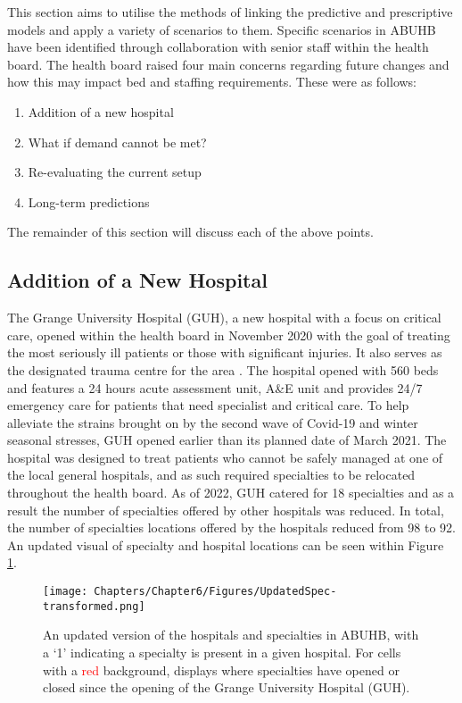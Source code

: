 \documentclass[../thesis.tex]{subfiles}
\begin{document}
This section aims to utilise the methods of linking the predictive and prescriptive models and apply a variety of scenarios to them. Specific scenarios in ABUHB have been identified through collaboration with senior staff within the health board. The health board raised four main concerns regarding future changes and how this may impact bed and staffing requirements. These were as follows:

\begin{enumerate}
    \item Addition of a new hospital
    \item What if demand cannot be met? 
    \item Re-evaluating the current setup
    \item Long-term predictions
\end{enumerate}

The remainder of this section will discuss each of the above points.

\subsection{Addition of a New Hospital}\label{sec:scenario1}
The Grange University Hospital (GUH), a new hospital with a focus on critical care, opened within the health board in November 2020 with the goal of treating the most seriously ill patients or those with significant injuries. It also serves as the designated trauma centre for the area \cite{NHSWalesa}. The hospital opened with 560 beds and features a 24 hours acute assessment unit, A\&E unit and provides 24/7 emergency care for patients that need specialist and critical care. To help alleviate the strains brought on by the second wave of Covid-19 and winter seasonal stresses, GUH opened earlier than its planned date of March 2021. The hospital was designed to treat patients who cannot be safely managed at one of the local general hospitals, and as such required specialties to be relocated throughout the health board. As of 2022, GUH catered for 18 specialties and as a result the number of specialties offered by other hospitals was reduced. In total, the number of specialties locations offered by the hospitals reduced from 98 to 92. An updated visual of specialty and hospital locations can be seen within Figure \ref{fig:relocation}.
\begin{figure}[h!]
    \centering
    \texttt{[image: Chapters/Chapter6/Figures/UpdatedSpec-transformed.png]}
    \caption{An updated version of the hospitals and specialties in ABUHB, with a `1' indicating a specialty is present in a given hospital. For cells with a \textcolor{red}{red} background, displays where specialties have opened or closed since the opening of the Grange University Hospital (GUH).}
    \label{fig:relocation}
\end{figure}
\end{document}
